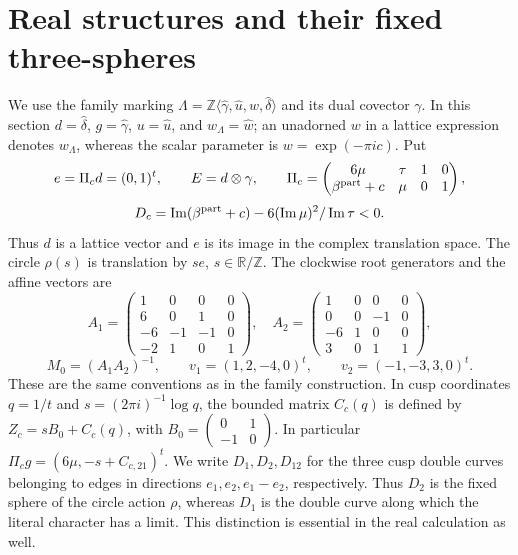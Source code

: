 \section{Real structures and their fixed three-spheres}\hypertarget{tag-02P9}{}\label{mapsI:real-forms}

We use the family marking
$\Lambda=\mathbb Z\langle\widehat\gamma,\widehat u,\widehat w,
\widehat\delta\rangle$ and its dual covector $\gamma$.
In this section $d=\widehat\delta$, $g=\widehat\gamma$,
$u=\widehat u$, and $w_{\Lambda}=\widehat w$; an unadorned $w$ in a
lattice expression denotes $w_{\Lambda}$, whereas the scalar parameter is
$w=\exp(-\pi i c)$. Put
\[
 e=\Pi_c d=(0,1)^t,\qquad E=d\otimes\gamma,
 \qquad \Pi_c=
 \begin{pmatrix}6\mu&\tau&1&0\\\beta^{\rm part}+c&\mu&0&1\end{pmatrix},
\]
\[
 D_c=\operatorname{Im}(\beta^{\rm part}+c)
       -6(\operatorname{Im}\mu)^2/\operatorname{Im}\tau<0.
\]
Thus $d$ is a lattice vector and $e$ is its image in the complex translation
space. The circle $\rho(s)$ is translation by $se$, $s\in\mathbb R/\mathbb Z$.
The clockwise root generators and the affine vectors are
\[
 A_1=\begin{pmatrix}1&0&0&0\\6&0&1&0\\-6&-1&-1&0\\-2&1&0&1\end{pmatrix},\quad
 A_2=\begin{pmatrix}1&0&0&0\\0&0&-1&0\\-6&1&0&0\\3&0&1&1\end{pmatrix},
\]
\[
 M_0=(A_1A_2)^{-1},\qquad
 v_1=(1,2,-4,0)^t,\qquad v_2=(-1,-3,3,0)^t.
\]
These are the same conventions as in the family construction. In cusp
coordinates $q=1/t$ and $s=(2\pi i)^{-1}\log q$, the bounded matrix $C_c(q)$
is defined by $Z_c=sB_0+C_c(q)$, with
$B_0=\left(\begin{smallmatrix}0&1\\-1&0\end{smallmatrix}\right)$.
In particular $\Pi_cg=(6\mu,-s+C_{c,21})^t$.
We write $D_1,D_2,D_{12}$ for the three cusp double curves belonging to
edges in directions $e_1,e_2,e_1-e_2$, respectively. Thus $D_2$ is the
fixed sphere of the circle action $\rho$, whereas $D_1$ is the double
curve along which the literal character has a limit. This distinction
is essential in the real calculation as well.

